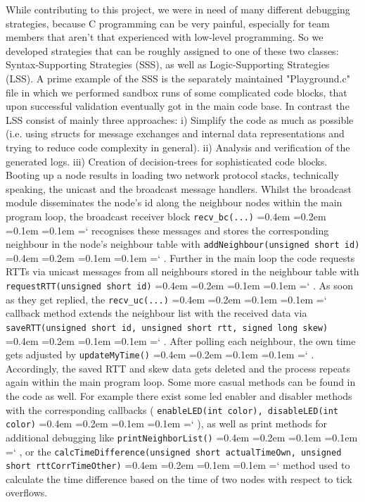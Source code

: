 \documentclass{llncs}
\newcommand{\code}[1]{%
	\texttt{#1}%
	\fontdimen2\font=0.4em
	\fontdimen3\font=0.2em
	\fontdimen4\font=0.1em
	\fontdimen7\font=0.1em
	\hyphenchar\font=`\-
}
\begin{document}
	\noindent While contributing to this project, we were in need of many different debugging strategies, because C programming can be very painful, especially for team members that aren't that experienced with low-level programming.
	So we developed strategies that can be roughly assigned to one of these two classes: Syntax-Supporting Strategies (SSS), as well as Logic-Supporting Strategies (LSS). 
	A prime example of the SSS is the separately maintained "Playground.c" file in which we performed sandbox runs of some complicated code blocks, that upon successful validation eventually got in the main code base.
	In contrast the LSS consist of mainly three approaches: i) Simplify the code as much as possible (i.e. using structs for message exchanges and internal data representations and trying to reduce code complexity in general). ii) Analysis and verification of the generated logs. iii) Creation of decision-trees for sophisticated code blocks.\\
	Booting up a node results in loading two network protocol stacks, technically speaking, the unicast and the broadcast message handlers. Whilst the broadcast module disseminates the node's id along the neighbour nodes within the main program loop, the broadcast receiver block \code{recv\_bc(...)} recognises these messages and stores the corresponding neighbour in the node's neighbour table with \code{addNeighbour(unsigned short id)}. Further in the main loop the code requests RTTs via unicast messages from all neighbours stored in the neighbour table with \code{requestRTT(unsigned short id)}. As soon as they get replied, the \code{recv\_uc(...)} callback method extends the neighbour list with the received data via \code{saveRTT(unsigned short id, unsigned short rtt, signed long skew)}.
	After polling each neighbour, the own time gets adjusted by \code{updateMyTime()}. Accordingly, the saved RTT and skew data gets deleted and the process repeats again within the main program loop.
	Some more casual methods can be found in the code as well. For example there exist some led enabler and disabler methods with the corresponding callbacks (\code{enableLED(int color), disableLED(int color)}), as well as print methods for additional debugging like \code{print\-Neighbor\-List()}, or the \code{calcTimeDifference(unsigned short actualTimeOwn, un\-sign\-ed short rttCorrTimeOther)} method used to calculate the time difference based on the time of two nodes with respect to tick overflows.
	
\end{document}
